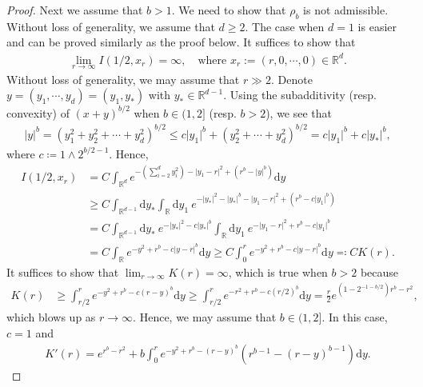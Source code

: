 \documentclass[sn-mathphys]{sn-jnl}%
\newcommand{\BR}{\mathbb{R}}
\newcommand{\ud}{\ensuremath{\mathrm{d}}}
\numberwithin{equation}{section}
\theoremstyle{thmstyleone}%
\theoremstyle{thmstyletwo}%
\theoremstyle{thmstylethree}%
\begin{document}
\begin{proof}
  Next we assume that $b>1$. We need to show that $\rho_b$ is not admissible. Without loss of
  generality, we assume that $d\ge 2$. The case when $d = 1$ is easier and can be proved similarly
  as the proof below. It suffices to show that
	\begin{align*}
    \lim_{r\to\infty} I(1/2,x_r) = \infty, \quad \text{where $x_r:=(r,0,\cdots,0)\in\BR^d$.}
	\end{align*}
  Without loss of generality, we may assume that $r\gg 2$. Denote $y=(y_1,\cdots, y_d) = (y_1,y_*)$
  with $y_*\in\BR^{d-1}$. Using the subadditivity (resp. convexity) of $(x+y)^{b/2}$ when $b\in
  (1,2]$ (resp. $b>2$), we see that
	\begin{align*} %
	\lvert  y  \rvert ^b =  \left(y_1^2+y_2^2+\cdots+y_d^2\right)^{b/2}
	\le c \lvert y_1 \rvert^b + \left(y_2^2+\cdots+y_d^2\right)^{b/2}
	=   c \lvert y_1 \rvert^b + c \lvert y_* \rvert^b,
	\end{align*}
  where $c \coloneqq 1 \wedge 2^{b/2 -1}$. Hence,
	\begin{align*}
    I\left(1/2,x_r\right)
    & = C \int_{\BR^d} e^{- \left(\sum_{i = 2}^{d} y_i^2\right) - \lvert y_1-r \rvert^2 + (r^b - \lvert y \rvert^b)} \ud y                \\
    & \ge C \int_{\BR^{d-1}}\ud y_* \int_\BR \ud y_1\: e^{- \lvert y_* \rvert^2 -\lvert y_* \rvert^b - \lvert y_1-r \rvert^2 + (r^b - c \lvert y_1 \rvert^b)}     \\
    & = C \int_{\BR^{d-1}}\ud y_* \: e^{- \lvert y_* \rvert^2 -c \lvert y_* \rvert^b} \int_\BR \ud y_1\: e^{- \lvert y_1-r \rvert^2 + r^b - c\lvert y_1 \rvert^b} \\
    & = C \int_\BR e^{- y^2 + r^b - c \lvert y-r \rvert^b} \ud y
      \ge C \int_0^r e^{- y^2 + r^b - c \lvert y-r \rvert^b} \ud y \eqqcolon C K(r).
  \end{align*}
  It suffices to show that $\lim_{r\to\infty}K(r) = \infty$, which is true when $b>2$ because
  \begin{align*}
    K(r)
    & \ge \int_{r/2}^{r} e^{-y^2 +r^b - c (r-y)^b} \ud y
      \ge \int_{r/2}^{r} e^{-r^2 +r^b - c (r/2)^b} \ud y
    = \frac{r}{2} e^{ \left(1-2^{-1-b/2}\right)r^b -r^2 },
	\end{align*}
  which blows up as $r\to \infty$. Hence, we may assume that $b\in (1,2]$. In this case, $c=1$ and
	\begin{align*} %
	K'(r) = e^{r^b-r^2} + b \int_0^r e^{ - y^2 + r^b - (r-y)^b} \left(r^{b-1}-(r-y)^{b-1}\right) \ud y.
	\end{align*}

\end{proof}
\end{document}

